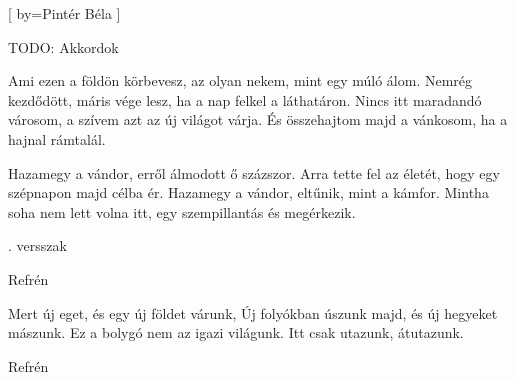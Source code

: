 [
  by={Pintér Béla}
]

  \beginverse*
    TODO: Akkordok
  \endverse

  \beginverse
    Ami ezen a földön körbevesz, az olyan nekem, mint egy múló álom.
    Nemrég kezdődött, máris vége lesz, ha a nap felkel a láthatáron.
    Nincs itt maradandó városom, a szívem azt az új világot várja.
    És összehajtom majd a vánkosom, ha a hajnal rámtalál.
  \endverse

  \beginchorus
    Hazamegy a vándor, erről álmodott ő százszor.
    Arra tette fel az életét, hogy egy szépnapon majd célba ér.
    Hazamegy a vándor, eltűnik, mint a kámfor.
    Mintha soha nem lett volna itt, egy szempillantás és megérkezik.
  \endchorus

  . versszak
  \endverse

  \beginverse*
    Refrén
  \endverse

  \beginverse*
    Mert új eget, és egy új földet várunk,
    Új folyókban úszunk majd, és új hegyeket mászunk.
    Ez a bolygó nem az igazi világunk.
    Itt csak utazunk, átutazunk.
  \endverse

  \beginverse*
    Refrén 
  \endverse

\endsong
